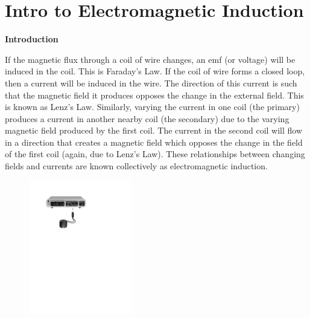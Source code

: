 \section{Intro to Electromagnetic Induction}
\label{induction_intro}

\makelabheader %



\bigskip

\textbf{Introduction} 

If the magnetic flux through a coil of wire changes, an emf (or voltage) 
will be induced in the coil. This is Faraday's Law. If the coil of wire 
forms a closed loop, then a current will be induced in the wire. The direction 
of this current is such that the magnetic field it produces opposes the change 
in the external field. This is known as Lenz's Law. Similarly, varying the 
current in one coil (the primary) produces a current in another nearby coil 
(the secondary) due to the varying magnetic field produced by the first coil. 
The current in the second coil will flow in a direction that creates a magnetic
field which opposes the change in the field of the first coil (again, due to 
Lenz's Law). These relationships between changing fields and currents are known 
collectively as electromagnetic induction.

\bigskip

\begin{figure}
\vspace{-0.5in}
    \includegraphics[width=0.4\textwidth]{induction_intro/induction1_setup_550.pdf}
\end{figure}

